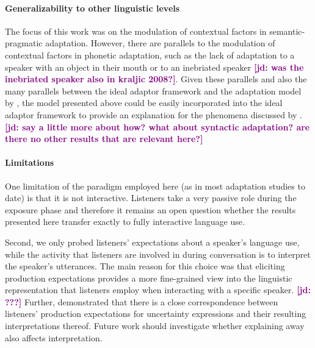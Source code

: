 \documentclass[man,floatsintext]{apa6}
\newcommand{\jd}[1]{\textcolor{Purple}{\bf [jd: #1]}}
\begin{document}

\paragraph{Generalizability to other linguistic levels} The focus of this work was on the modulation of contextual factors in semantic-pragmatic adaptation. However, there are parallels to the modulation of contextual factors in phonetic adaptation, such as the lack of adaptation to a speaker with an object in their mouth or to an inebriated speaker \cite{Kraljic2008} \jd{was the inebriated speaker also in kraljic 2008?}. Given these parallels and also the many parallels between the ideal adaptor framework \cite{Kleinschmidt2015} and the adaptation model by , the model presented above could be easily incorporated into the ideal adaptor framework to provide an explanation for the phenomena discussed by . \jd{say a little more about how? what about syntactic adaptation? are there no other results that are relevant here?}

\paragraph{Limitations} One limitation of the paradigm employed here (as in most adaptation studies to date) is that it is not interactive. Listeners take a very passive role during the exposure phase and therefore it remains an open question whether the results presented here transfer exactly to fully interactive language use.

Second, we only probed listeners' expectations about a speaker's language use, while the activity that listeners are involved in during conversation is to interpret the speaker's utterances. The main reason for this choice was that eliciting production expectations provides a more fine-grained view into the linguistic representation that listeners employ when interacting with a specific speaker. \jd{???} Further,  demonstrated that there is a close correspondence between listeners' production expectations for uncertainty expressions and their resulting interpretations thereof. Future work should investigate whether explaining away also affects interpretation.

\end{document}
